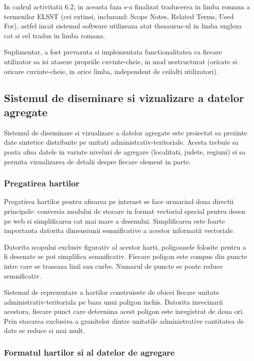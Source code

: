 \documentclass[a4paper, 10pt]{article}
\begin{document}
{In cadrul activitatii 6.2, in aceasta faza s-a finalizat traducerea in limba romana a termenilor ELSST (cei extinsi, incluzand: Scope Notes, Related Terms, Used For), 
astfel incat sistemul software utilizeaza atat thesaurus-ul in limba engleza cat si cel tradus in limba romana.

Suplimentar, a fost prevazuta si implementata functionalitatea ca fiecare utilizator sa isi ataseze propriile cuvinte-cheie,
in mod nestructurat (oricate si oricare cuvinte-cheie, in orice limba, independent de ceilalti utilizatori).

\subsection{Sistemul de diseminare si vizualizare a datelor agregate}

Sistemul de diseminare si vizualizare a datelor agregate este proiectat sa prezinte date sintetice 
distribuite pe unitati administrativ-teritoriale. 
Acesta trebuie sa poata afisa datele in variate niveluri de agregare (localitati, judete, regiuni) 
si sa permita vizualizarea de detalii despre fiecare element in parte. 

\subsubsection{Pregatirea hartilor}

Pregatirea hartilor pentru afisarea pe internet se face urmarind doua directii principale: 
conversia modului de stocare in format vectorial special pentru desen pe web si simplificarea cat mai mare a desenului. 
Simplificarea este foarte importanta datorita dimensiunii semnificative a acestor informatii vectoriale. 

Datorita scopului exclusiv figurativ al acestor harti, poligoanele folosite pentru a fi desenate se pot simplifica semnificativ. Fiecare poligon este compus din puncte intre care se traseaza linii sau curbe. Numarul de puncte se poate reduce semnificativ. 

Sistemul de reprezentare a hartilor construieste de obicei fiecare unitate administrativ-teritoriala pe baza unui poligon inchis. Datorita invecinarii acestora, fiecare punct care determina acest poligon este inregistrat de doua ori. Prin stocarea exclusiva a granitelor dintre unitatile administrative cantitatea de date se reduce si mai mult. 

\subsubsection{Formatul hartilor si al datelor de agregare}

}
\end{document}
